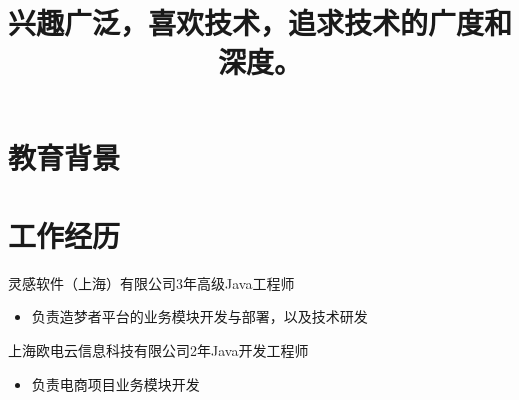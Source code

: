 \documentclass[11pt,a4paper,sans]{moderncv} %
\title{兴趣广泛，喜欢技术，追求技术的广度和深度。   }
\begin{document}


%
%
%
%
%



\makecvtitle %

\section{教育背景}


\section{工作经历}
 {灵感软件（上海）有限公司}{3年}{高级Java工程师}{}{
\begin{itemize}
    \item 负责造梦者平台的业务模块开发与部署，以及技术研发
\end{itemize}
}

 {上海欧电云信息科技有限公司}{2年}{Java开发工程师}{}{
\begin{itemize}
    \item 负责电商项目业务模块开发
\end{itemize}
}
\end{document}
